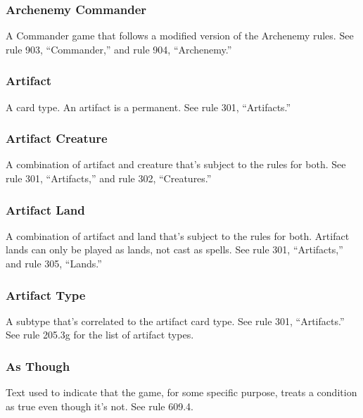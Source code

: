 {\subsubsection*{Archenemy Commander}

A Commander game that follows a modified version of the Archenemy rules. See rule 903, “Commander,” and rule 904, “Archenemy.”

\subsubsection*{Artifact}

A card type. An artifact is a permanent. See rule 301, “Artifacts.”

\subsubsection*{Artifact Creature}

A combination of artifact and creature that’s subject to the rules for both. See rule 301, “Artifacts,” and rule 302, “Creatures.”

\subsubsection*{Artifact Land}

A combination of artifact and land that’s subject to the rules for both. Artifact lands can only be played as lands, not cast as spells. See rule 301, “Artifacts,” and rule 305, “Lands.”

\subsubsection*{Artifact Type}

A subtype that’s correlated to the artifact card type. See rule 301, “Artifacts.” See rule 205.3g for the list of artifact types.

\subsubsection*{As Though}

Text used to indicate that the game, for some specific purpose, treats a condition as true even though it’s not. See rule 609.4.

}
